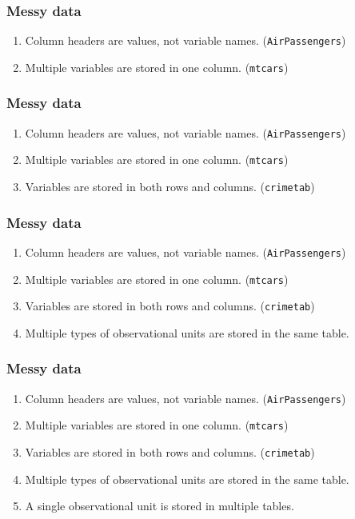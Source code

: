 \documentclass{beamer}
\begin{document}
\begin{frame}
	\frametitle{Messy data}
	\begin{center}
		\begin{enumerate}
			\item Column headers are values, not variable names. 
			(\texttt{AirPassengers})
			\item Multiple variables are stored in one column. (\texttt{mtcars})
		\end{enumerate}
	\end{center}
\end{frame}

\begin{frame}
	\frametitle{Messy data}
	\begin{center}
		\begin{enumerate}
			\item Column headers are values, not variable names. 
			(\texttt{AirPassengers})
			\item Multiple variables are stored in one column. (\texttt{mtcars})
			\item Variables are stored in both rows and columns. 
			(\texttt{crimetab})
		\end{enumerate}
	\end{center}
\end{frame}

\begin{frame}
	\frametitle{Messy data}
	\begin{center}
		\begin{enumerate}
			\item Column headers are values, not variable names. 
			(\texttt{AirPassengers})
			\item Multiple variables are stored in one column. (\texttt{mtcars})
			\item Variables are stored in both rows and columns. 
			(\texttt{crimetab})
			\item Multiple types of observational units are stored in the same 
			table.
		\end{enumerate}
	\end{center}
\end{frame}

\begin{frame}
	\frametitle{Messy data}
	\begin{center}
		\begin{enumerate}
			\item Column headers are values, not variable names. 
			(\texttt{AirPassengers})
			\item Multiple variables are stored in one column. (\texttt{mtcars})
			\item Variables are stored in both rows and columns. 
			(\texttt{crimetab})
			\item Multiple types of observational units are stored in the same 
			table.
			\item A single observational unit is stored in multiple tables.
		\end{enumerate}
	\end{center}
\end{frame}
\end{document}

